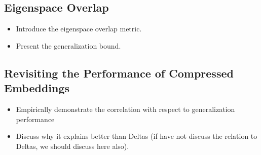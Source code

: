 \subsection{Eigenspace Overlap}
\label{subsec:eigen_overlap}
	\begin{itemize}
		\item Introduce the eigenspace overlap metric.
		\item Present the generalization bound.
	\end{itemize}
	
\subsection{Revisiting the Performance of Compressed Embeddings}
\label{subsec:revisit}
	\begin{itemize}
		\item Empirically demonstrate the correlation with respect to generalization performance
		\item Discuss why it explains better than Deltas (if have not discuss the relation to Deltas, we should discuss here also).
	\end{itemize}